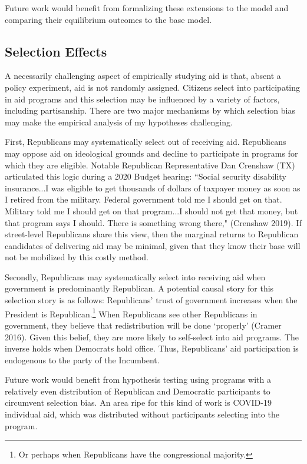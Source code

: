\documentclass[12pt]{paper}
\begin{document}
Future work would benefit from formalizing these extensions to the model and comparing their equilibrium outcomes to the base model.

\subsection{Selection Effects}
A necessarily challenging aspect of empirically studying aid is that, absent a policy experiment, aid is not randomly assigned. Citizens select into participating in aid programs and this selection may be influenced by a variety of factors, including partisanship. There are two major mechanisms by which selection bias may make the empirical analysis of my hypotheses challenging.

First, Republicans may systematically select out of receiving aid. Republicans may oppose aid on ideological grounds and decline to participate in programs for which they are eligible. Notable Republican Representative Dan Crenshaw (TX) articulated this logic during a 2020 Budget hearing: ``Social security disability insurance...I was eligible to get thousands of dollars of taxpayer money as soon as I retired from the military. Federal government told me I should get on that. Military told me I should get on that program...I should not get that money, but that program says I should. There is something wrong there," (Crenshaw 2019). If street-level Republicans share this view, then the marginal returns to Republican candidates of delivering aid may be minimal, given that they know their base will not be mobilized by this costly method.

Secondly, Republicans may systematically select into receiving aid when government is predominantly Republican. A potential causal story for this selection story is as follows: Republicans' trust of government increases when the President is Republican.\footnote{Or perhaps when Republicans have the congressional majority.} When Republicans see other Republicans in government, they believe that redistribution will be done `properly' (Cramer 2016). Given this belief, they are more likely to self-select into aid programs. The inverse holds when Democrats hold office. Thus, Republicans' aid participation is endogenous to the party of the Incumbent.

Future work would benefit from hypothesis testing using programs with a relatively even distribution of Republican and Democratic participants to circumvent selection bias. An area ripe for this kind of work is COVID-19 individual aid, which was distributed without participants selecting into the program.
\end{document}
